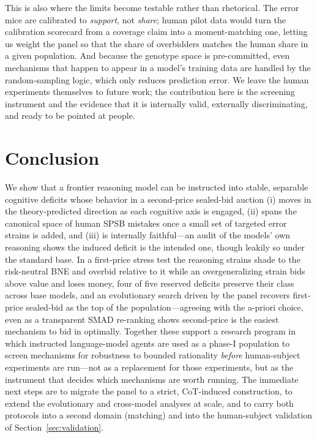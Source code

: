 \documentclass[12pt]{article}
\begin{document}
This is also where the limits become testable rather than rhetorical. The error
mice are calibrated to \emph{support}, not \emph{share}; human pilot data would turn
the calibration scorecard from a coverage claim into a moment-matching one, letting
us weight the panel so that the share of overbidders matches the human share in a
given population. And because the genotype space is pre-committed, even mechanisms
that happen to appear in a model's training data are handled by the random-sampling
logic, which only reduces prediction error. We leave the human experiments
themselves to future work; the contribution here is the screening instrument and the
evidence that it is internally valid, externally discriminating, and ready to be
pointed at people.

\section{Conclusion}
\label{sec:conclusion}

We show that a frontier reasoning model can be instructed into stable, separable
cognitive deficits whose behavior in a second-price sealed-bid auction (i) moves in
the theory-predicted direction as each cognitive axis is engaged, (ii) spans the
canonical space of human SPSB mistakes once a small set of targeted error strains is
added, and (iii) is internally faithful---an audit of the models' own reasoning
shows the induced deficit is the intended one, though leakily so under the standard
base. In a first-price stress test the reasoning strains shade to the risk-neutral
BNE and overbid relative to it while an overgeneralizing strain bids above value and
loses money, four of five reserved deficits preserve their class across base models,
and an evolutionary search driven by the panel recovers first-price sealed-bid as
the top of the population---agreeing with the a-priori choice, even as a transparent
SMAD re-ranking shows second-price is the easiest mechanism to bid in optimally.
Together these support a research program in which instructed language-model agents
are used as a phase-I population to screen mechanisms for robustness to bounded
rationality \emph{before} human-subject experiments are run---not as a replacement
for those experiments, but as the instrument that decides which mechanisms are worth
running. The immediate next steps are to migrate the panel to a strict, CoT-induced
construction, to extend the evolutionary and cross-model analyses at scale, and to
carry both protocols into a second domain (matching) and into the human-subject
validation of Section~\ref{sec:validation}.
\end{document}
